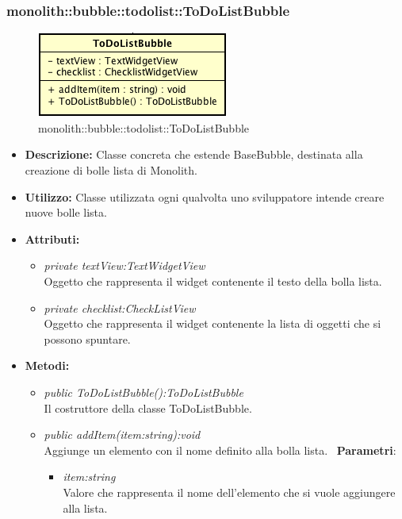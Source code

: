 \subsubsection{monolith::bubble::todolist::ToDoListBubble}

\label{monolith::bubble::todolist::ToDoListBubble}
\begin{figure}[ht]
	\centering
	\includegraphics[scale=0.5]{Sezioni/SottosezioniST/img/ToDoListBubble.png}
	\caption{monolith::bubble::todolist::ToDoListBubble}
\end{figure}

\begin{itemize}
\item \textbf{Descrizione:} Classe concreta che estende BaseBubble, destinata alla creazione di bolle lista di Monolith.
\item \textbf{Utilizzo:} Classe utilizzata ogni qualvolta uno sviluppatore intende creare nuove bolle lista.
\item \textbf{Attributi:}
\begin{itemize}
\item \textit{private textView:TextWidgetView}\\
Oggetto che rappresenta il widget contenente il testo della bolla lista.
\item \textit{private checklist:CheckListView}\\
Oggetto che rappresenta il widget contenente la lista di oggetti che si possono spuntare.
\end{itemize}
\item \textbf{Metodi:}
\begin{itemize}
\item \textit{public ToDoListBubble():ToDoListBubble}\\
Il costruttore della classe ToDoListBubble.
\item \textit{public addItem(item:string):void}\\
Aggiunge un elemento con il nome definito alla bolla lista.
\ \textbf{Parametri}: \begin{itemize}
\item \textit{item:string}\\
Valore che rappresenta il nome dell'elemento che si vuole aggiungere alla lista.
\end{itemize}
\end{itemize}
\end{itemize}

